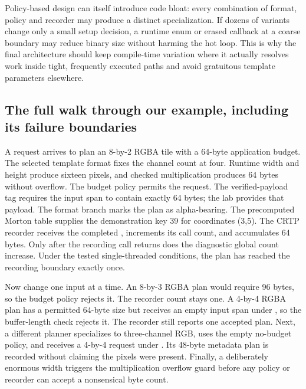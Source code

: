 Policy-based design can itself introduce code bloat: every combination of format, policy and recorder may produce a distinct specialization. If dozens of variants change only a small setup decision, a runtime enum or erased callback at a coarse boundary may reduce binary size without harming the hot loop. This is why the final architecture should keep compile-time variation where it actually resolves work inside tight, frequently executed paths and avoid gratuitous template parameters elsewhere.

\subsection{The full walk through our example, including its failure boundaries}\label{05-engine-i-ch005-the-full-walk-through-our-example-including-its-failure-boundaries}

\hypertarget{05-engine-i-ch005-the-full-walk-through-our-example-including-its-failure-boundaries}{}

A request arrives to plan an 8-by-2 RGBA tile with a 64-byte application budget. The selected template format fixes the channel count at four. Runtime width and height produce sixteen pixels, and checked multiplication produces 64 bytes without overflow. The budget policy permits the request. The verified-payload tag requires the input span to contain exactly 64 bytes; the lab provides that payload. The  format branch marks the plan as alpha-bearing. The precomputed Morton table supplies the demonstration key 39 for coordinates (3,5). The CRTP recorder receives the completed , increments its call count, and accumulates 64 bytes. Only after the recording call returns does the diagnostic global count increase. Under the tested single-threaded conditions, the plan has reached the recording boundary exactly once.

Now change one input at a time. An 8-by-3 RGBA plan would require 96 bytes, so the budget policy rejects it. The recorder count stays one. A 4-by-4 RGBA plan has a permitted 64-byte size but receives an empty input span under , so the buffer-length check rejects it. The recorder still reports one accepted plan. Next, a different planner specializes to three-channel RGB, uses the empty no-budget policy, and receives a 4-by-4 request under . Its 48-byte metadata plan is recorded without claiming the pixels were present. Finally, a deliberately enormous width triggers the multiplication overflow guard before any policy or recorder can accept a nonsensical byte count.

